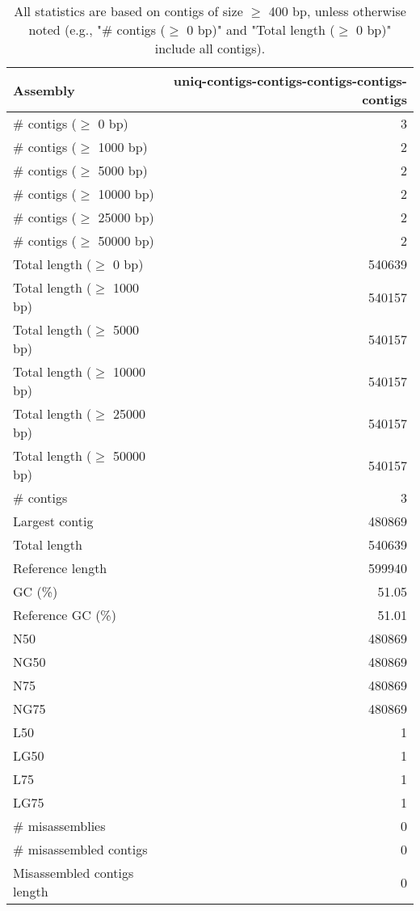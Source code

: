 \documentclass[12pt,a4paper]{article}
\begin{document}
\begin{table}[ht]
\begin{center}
\caption{All statistics are based on contigs of size $\geq$ 400 bp, unless otherwise noted (e.g., "\# contigs ($\geq$ 0 bp)" and "Total length ($\geq$ 0 bp)" include all contigs).}
\begin{tabular}{|l*{1}{|r}|}
\hline
Assembly & uniq-contigs-contigs-contigs-contigs-contigs \\ \hline
\# contigs ($\geq$ 0 bp) & 3 \\ \hline
\# contigs ($\geq$ 1000 bp) & 2 \\ \hline
\# contigs ($\geq$ 5000 bp) & 2 \\ \hline
\# contigs ($\geq$ 10000 bp) & 2 \\ \hline
\# contigs ($\geq$ 25000 bp) & 2 \\ \hline
\# contigs ($\geq$ 50000 bp) & 2 \\ \hline
Total length ($\geq$ 0 bp) & 540639 \\ \hline
Total length ($\geq$ 1000 bp) & 540157 \\ \hline
Total length ($\geq$ 5000 bp) & 540157 \\ \hline
Total length ($\geq$ 10000 bp) & 540157 \\ \hline
Total length ($\geq$ 25000 bp) & 540157 \\ \hline
Total length ($\geq$ 50000 bp) & 540157 \\ \hline
\# contigs & 3 \\ \hline
Largest contig & 480869 \\ \hline
Total length & 540639 \\ \hline
Reference length & 599940 \\ \hline
GC (\%) & 51.05 \\ \hline
Reference GC (\%) & 51.01 \\ \hline
N50 & 480869 \\ \hline
NG50 & 480869 \\ \hline
N75 & 480869 \\ \hline
NG75 & 480869 \\ \hline
L50 & 1 \\ \hline
LG50 & 1 \\ \hline
L75 & 1 \\ \hline
LG75 & 1 \\ \hline
\# misassemblies & 0 \\ \hline
\# misassembled contigs & 0 \\ \hline
Misassembled contigs length & 0 \\ \hline

\end{tabular}
\end{center}
\end{table}
\end{document}
